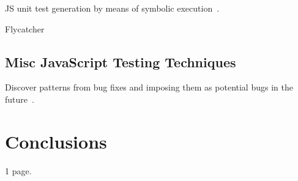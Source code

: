 \documentclass[sigconf]{acmart}
\begin{document}
JS unit test generation by means of symbolic execution~\cite{tanida2014automatic}.

Flycatcher~\cite{deautomatic}

\subsection{Misc JavaScript Testing Techniques}
\label{sub.sec.misc.test.tech}

Discover patterns from bug fixes and imposing them as potential bugs in the future~\cite{quinn:fse16}. 

\section{Conclusions}
\label{sec:concl}
1 page.


 
\end{document}
